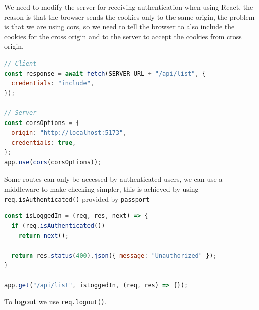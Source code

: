 \documentclass[12pt]{article}
\begin{document}
We need to modify the server for receiving authentication when using React, the reason is that the browser sends the cookies only to the same origin, the problem is that we are using cors, so we need to tell the browser to also include the cookies for the cross origin and to the server to accept the cookies from cross origin.
\begin{lstlisting}[language=js]
// Client
const response = await fetch(SERVER_URL + "/api/list", {
  credentials: "include",
});

// Server
const corsOptions = {
  origin: "http://localhost:5173",
  credentials: true,
};
app.use(cors(corsOptions));
\end{lstlisting}
Some routes can only be accessed by authenticated users, we can use a middleware to make checking simpler, this is achieved by using \texttt{req.isAuthenticated()} provided by \texttt{passport}
\begin{lstlisting}[language=js]
const isLoggedIn = (req, res, next) => {
  if (req.isAuthenticated())
    return next();

  return res.status(400).json({ message: "Unauthorized" });
}

app.get("/api/list", isLoggedIn, (req, res) => {});
\end{lstlisting}
To \textbf{logout} we use \texttt{req.logout()}.
\end{document}
